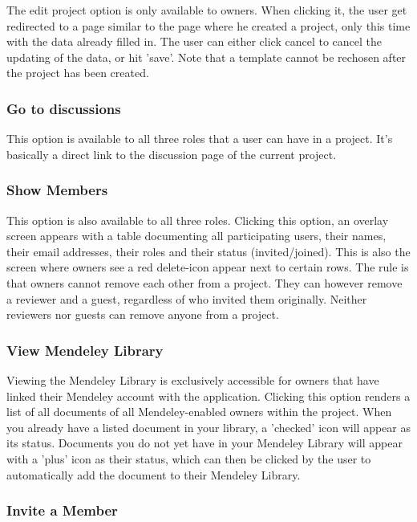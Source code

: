 The edit project option is only available to owners. When clicking it, the user get redirected to a page similar to the page where he created a project,
only this time with the data already filled in. The user can either click cancel to cancel the updating of the data, or hit 'save'. Note
that a template cannot be rechosen after the project has been created.

\subsubsection{Go to discussions}

This option is available to all three roles that a user can have in a project. It's basically a direct link to the discussion page of the current
project.

\subsubsection{Show Members}

This option is also available to all three roles. Clicking this option, an overlay screen appears with a table documenting all participating
users, their names, their email addresses, their roles and their status (invited/joined). This is also the screen where owners see a red
delete-icon appear next to certain rows. The rule is that owners cannot remove each other from a project. They can however remove a reviewer 
and a guest, regardless of who invited them originally. Neither reviewers nor guests can remove anyone from a project.

\subsubsection{View Mendeley Library}

Viewing the Mendeley Library is exclusively accessible for owners that have linked their Mendeley account with the application. Clicking this
option renders a list of all documents of all Mendeley-enabled owners within the project. When you already have a listed document in your library, a 
'checked' icon will appear as its status. Documents you do not yet have in your Mendeley Library will appear with a 'plus' icon as their status,
which can then be clicked by the user to automatically add the document to their Mendeley Library.

\subsubsection{Invite a Member}

